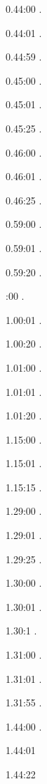 \documentclass[italian]{article}
\begin{document}
0.44:00   .

0.44:01   .

0.44:59   .

0.45:00   .

0.45:01   .

0.45:25   .

0.46:00   .

0.46:01   .

0.46:25   .

0.59:00   .

0.59:01   .

0.59:20   .

:00  .

1.00:01   . 

1.00:20  .

1.01:00   . 

1.01:01  .

1.01:20   . 

1.15:00   . 

1.15:01   . 

1.15:15   . 

1.29:00   . 

1.29:01   . 

1.29:25   . 

1.30:00   .

1.30:01   .

1.30:1   .

1.31:00   .

1.31:01   .

1.31:55   .

1.44:00   .

1.44:01   

1.44:22   
\end{document}
